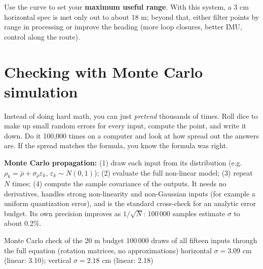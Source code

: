 
\begin{tip}
Use the curve to set your \textbf{maximum useful range}. With this system, a 3 cm horizontal spec is met only out to about 18 m; beyond that, either filter points by range in processing or improve the heading (more loop closures, better IMU, control along the route).
\end{tip}

\section{Checking with Monte Carlo simulation}
\begin{kid}
Instead of doing hard math, you can just \emph{pretend} thousands of times. Roll dice to make up small random errors for every input, compute the point, and write it down. Do it 100,000 times on a computer and look at how spread out the answers are. If the spread matches the formula, you know the formula was right.
\end{kid}

\begin{eng}
\textbf{Monte Carlo propagation:} (1) draw each input from its distribution (e.g.\ $\rho_k=\bar\rho+\sigma_\rho\varepsilon_k$, $\varepsilon_k\sim N(0,1)$); (2) evaluate the full non-linear model; (3) repeat $N$ times; (4) compute the sample covariance of the outputs. It needs no derivatives, handles strong non-linearity and non-Gaussian inputs (for example a uniform quantization error), and is the standard cross-check for an analytic error budget. Its own precision improves as $1/\sqrt N$: 100\,000 samples estimate $\sigma$ to about 0.2\%.
\end{eng}


\begin{worked}{Monte Carlo check of the 20 m budget}
 100\,000 draws of all fifteen inputs through the full equation (rotation matrices, no approximations)
 horizontal $\sigma=3.09$ cm (linear: 3.10); vertical $\sigma=2.18$ cm (linear: 2.18)
\end{worked}

